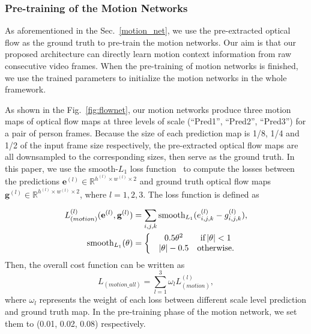 \documentclass[journal]{IEEEtran}
\begin{document}
\subsubsection{Pre-training of the Motion Networks}\label{pre_motion}
As aforementioned in the Sec.~\ref{motion_net}, we use the pre-extracted optical flow as the ground truth to pre-train the motion networks. Our aim is that our proposed architecture can directly learn motion context information from raw consecutive video frames. When the pre-training of motion networks is finished, we use the trained parameters to initialize the motion networks in the whole framework. 

As shown in the Fig.~\ref{fig:flownet}, our motion networks produce three motion maps of optical flow maps at three levels of scale (``Pred1'', ``Pred2'', ``Pred3'') for a pair of person frames. Because the size of each prediction map is 1/8, 1/4 and 1/2 of the input frame size respectively, the pre-extracted optical flow maps are all downsampled to the corresponding sizes, then serve as the ground truth. In this paper, we use the smooth-$L_{1}$  loss function~\cite{girshick2015fast} to compute the losses between the predictions $\textbf{e}^{(l)} \in\mathbb{R}^{h^{(l)}\times w^{(l)} \times 2} $ and ground truth optical flow maps $\textbf{g}^{(l)} \in\mathbb{R}^{h^{(l)}\times w^{(l)} \times 2} $, where $l = 1, 2 ,3$. The loss function is defined as

\begin{align}
L^{(l)}_{(motion)}(\textbf{e}^{(l)}, \textbf{g}^{(l)})&=\sum_{i,j,k}\textup{smooth}_{L_{1}}(e_{i,j,k}^{(l)}- g_{i,j,k}^{(l)}),\\
\textup{smooth}_{L_{1}}(\theta)&=\left\{\begin{matrix}
&0.5\theta^{2}   &\textup{if}\left | \theta \right |<1\\ 
&\left |\theta \right |-0.5&\textup{otherwise}.
\end{matrix}\right.
\end{align} 
Then, the overall cost function can be written as
\begin{equation}
L_{(motion\_all)}=\sum_{l=1}^{3}\omega_{l}L^{(l)}_{(motion)},
\end{equation}
where $\omega_{l}$ represents the weight of each loss between different scale level prediction and ground truth map. In the pre-training phase of the motion network, we set them to (0.01, 0.02, 0.08) respectively. 
\end{document}
